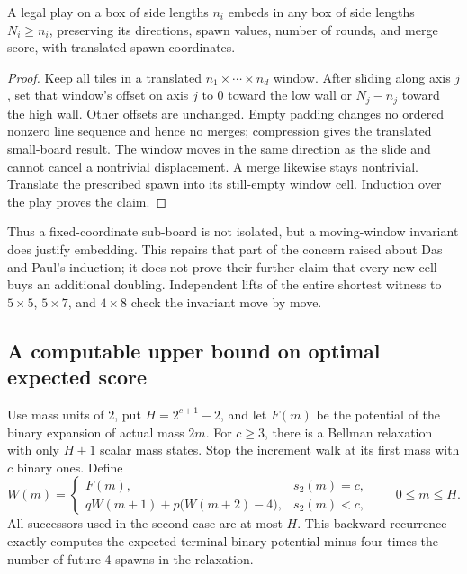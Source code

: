 \begin{proposition}\label{prop:embedding}
A legal play on a box of side lengths $n_i$ embeds in any box of side
lengths $N_i\ge n_i$, preserving its directions, spawn values, number
of rounds, and merge score, with translated spawn coordinates.
\end{proposition}
\begin{proof}
Keep all tiles in a translated $n_1\times\cdots\times n_d$ window.
After sliding along axis $j$, set that window's offset on axis $j$ to
0 toward the low wall or $N_j-n_j$ toward the high wall. Other offsets
are unchanged. Empty padding changes no ordered nonzero line sequence
and hence no merges; compression gives the translated small-board
result. The window moves in the same direction as the slide and cannot
cancel a nontrivial displacement. A merge likewise stays nontrivial.
Translate the prescribed spawn into its still-empty window cell.
Induction over the play proves the claim.
\end{proof}

Thus a fixed-coordinate sub-board is not isolated, but a moving-window
invariant does justify embedding. This repairs that part of the concern
raised about Das and Paul's induction; it does not prove their further
claim that every new cell buys an additional doubling. Independent lifts
of the entire shortest witness to $5\times5$, $5\times7$, and $4\times8$
check the invariant move by move.

\subsection{A computable upper bound on optimal expected score}
\label{sec:massbellman}

Use mass units of 2, put $H=2^{c+1}-2$, and let $F(m)$ be the
potential of the binary expansion of actual mass $2m$. For $c\ge3$,
there is a Bellman relaxation with only $H+1$ scalar mass states.
Stop the increment walk at its first mass with $c$ binary ones. Define
\[
W(m)=
\begin{cases}
F(m),&s_2(m)=c,\\
qW(m+1)+p\bigl(W(m+2)-4\bigr),&s_2(m)<c,
\end{cases}
\qquad 0\le m\le H.
\]
All successors used in the second case are at most $H$. This backward
recurrence exactly computes the expected terminal binary potential minus
four times the number of future 4-spawns in the relaxation.

